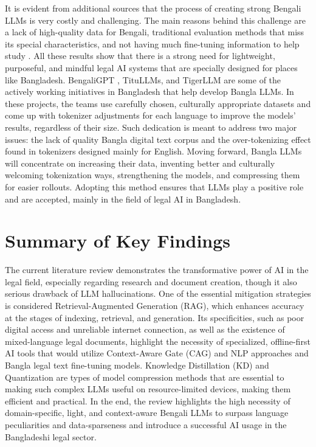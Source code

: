It is evident from additional sources that the process of creating strong Bengali LLMs is very costly and challenging. The main reasons behind this challenge are a lack of high-quality data for Bengali, traditional evaluation methods that miss its special characteristics, and not having much fine-tuning information to help study \cite{mahfuz2024latetrainearlyuse}. All these results show that there is a strong need for lightweight, purposeful, and mindful legal AI systems that are specially designed for places like Bangladesh. BengaliGPT \cite{unknown}, TituLLMs, and TigerLLM are some of the actively working initiatives in Bangladesh that help develop Bangla LLMs. In these projects, the teams use carefully chosen, culturally appropriate datasets and come up with tokenizer adjustments for each language to improve the models’ results, regardless of their size. Such dedication is meant to address two major issues: the lack of quality Bangla digital text corpus and the over-tokenizing effect found in tokenizers designed mainly for English. Moving forward, Bangla LLMs will concentrate on increasing their data, inventing better and culturally welcoming tokenization ways, strengthening the models, and compressing them for easier rollouts. Adopting this method ensures that LLMs play a positive role and are accepted, mainly in the field of legal AI in Bangladesh.

\section{Summary of Key Findings}

The current literature review demonstrates the transformative power of AI in the legal field, especially regarding research and document creation, though it also serious drawback of LLM hallucinations. One of the essential mitigation strategies is considered Retrieval-Augmented Generation (RAG), which enhances accuracy at the stages of indexing, retrieval, and generation. Its specificities, such as poor digital access and unreliable internet connection, as well as the existence of mixed-language legal documents, highlight the necessity of specialized, offline-first AI tools that would utilize Context-Aware Gate (CAG) and NLP approaches and Bangla legal text fine-tuning models. Knowledge Distillation (KD) and Quantization are types of model compression methods that are essential to making such complex LLMs useful on resource-limited devices, making them efficient and practical. In the end, the review highlights the high necessity of domain-specific, light, and context-aware Bengali LLMs to surpass language peculiarities and data-sparseness and introduce a successful AI usage in the Bangladeshi legal sector.



